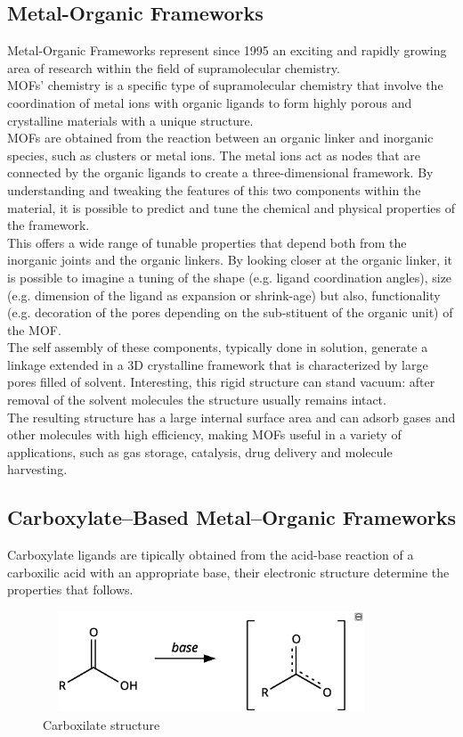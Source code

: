 \documentclass[../Master.tex]{subfiles}
\begin{document}
\subsection{Metal-Organic Frameworks}\label{subsec:mof}
Metal-Organic Frameworks represent since 1995 \cite{yaghi_hydrothermal_1995} an exciting and rapidly growing area of research within the field of supramolecular chemistry.\\
MOFs' chemistry is a specific type of supramolecular chemistry that involve the coordination of metal ions with organic ligands to form highly porous and crystalline materials with a unique structure. \\
MOFs are obtained from the reaction between an organic linker and inorganic species, such as clusters or metal ions. The metal ions act as nodes that are connected by the organic ligands to create a three-dimensional framework. By understanding and tweaking the features of this two components within the material, it is possible to predict and tune the chemical and physical properties of the framework.\\
This offers a wide range of tunable properties that depend both from the inorganic joints and the organic linkers. By looking closer at the organic linker, it is possible to imagine a tuning of the shape (e.g. ligand coordination angles), size (e.g. dimension of the ligand as expansion or shrink-age) but also, functionality (e.g. decoration of the pores depending on the sub-stituent of the organic unit) of the MOF.\\
The self assembly of these components, typically done in solution, generate a linkage extended in a 3D crystalline framework that is characterized by large pores filled of solvent. Interesting, this rigid structure can stand vacuum: after removal of the solvent molecules the structure usually remains intact. \\
The resulting structure has a large internal surface area and can adsorb gases and other molecules with high efficiency, making MOFs useful in a variety of applications, such as gas storage, catalysis, drug delivery and molecule harvesting.

\subsection{Carboxylate–Based Metal–Organic Frameworks}\label{cb-mof}

Carboxylate ligands are tipically obtained from the acid-base reaction of a carboxilic acid with an appropriate base, their electronic structure determine the properties that follows. \\
\begin{figure}[h!]
	\centering
	\includegraphics[width=10cm,height=3cm,keepaspectratio]{Structures/carboxstructure.eps}
	\caption{Carboxilate structure}\label{fig:carboxstructure}
\end{figure}
\end{document}
